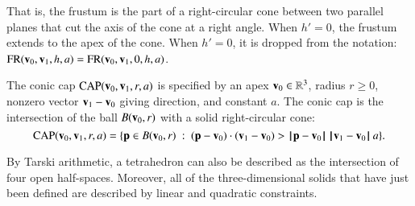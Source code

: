 That is, the frustum is the part of a right-circular cone between two
parallel planes that cut the axis of the cone at a right angle.  When
$h'=0$, the frustum extends to the apex of the cone.  When $h'=0$, it
is dropped from the notation:
${\operatorname{FR}}({\mathbf v}_0,{\mathbf v}_1,h,a)={\operatorname{FR}}({\mathbf v}_0,{\mathbf v}_1,0,h,a)$.

%


\begin{definition}
The conic cap ${\operatorname{CAP}}({\mathbf v}_0,{\mathbf v}_1,r,a)$ is specified by an apex
${\mathbf v}_0\in\mathbb{R}^3$,  radius $r\ge0$,  nonzero vector ${\mathbf v}_1-{\mathbf v}_0$ giving
direction, and constant $a$.  The conic cap is the intersection of
the ball $B({\mathbf v}_0,r)$ with a solid right-circular cone:
\[ 
\op{CAP}(\v_0,\v_1,r,a)=\{\p \in B(\v_0,r) 
\mid (\p-\v_0)\cdot (\v_1-\v_0) > \norm{\p}{\v_0}\, \norm{\v_1}{\v_0}\, a\}.
\] 
%
%
%
\end{definition}


\begin{remark}
  By Tarski arithmetic, %
  a tetrahedron can also be described as the intersection of four open
  half-spaces. Moreover,  all of
  the three-dimensional solids that have just been defined are
  described by linear and quadratic constraints.  
%
\end{remark}

\figHFHVHSV %


%

